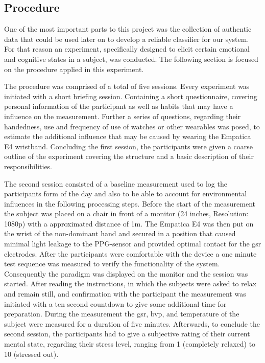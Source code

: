 \subsection{Procedure}
One of the most important parts to this project was the collection of authentic data that could be used later on to develop a reliable classifier for our system. For that reason an experiment, specifically designed to elicit certain emotional and cognitive states in a subject, was conducted. The following section is focused on the procedure applied in this experiment.

The procedure was comprised of a total of five sessions. Every experiment was initiated with a short briefing session. Containing a short questionnaire, covering personal information of the participant as well as habits that may have a influence on the measurement. Further a series of questions, regarding their handedness, use and frequency of use of watches or other wearables was posed, to estimate the additional influence that may be caused by wearing the Empatica E4 wristband.
Concluding the first session, the participants were given a coarse outline of the experiment covering the structure and a basic description of their responsibilities.

The second session consisted of a baseline measurement used to log the participants form of the day and also to be able to account for environmental influences in the following processing steps. Before the start of the measurement the subject was placed on a chair in front of a monitor (24 inches, Resolution: 1080p) with a approximated distance of 1m. The Empatica E4 was then put on the wrist of the non-dominant hand and secured in a position that caused minimal light leakage to the PPG-sensor and provided optimal contact for the \gls{gsr} electrodes. After the participants were comfortable with the device a one minute test sequence was measured to verify the functionality of the system.
Consequently the paradigm was displayed on the monitor and the session was started. After reading the instructions, in which the subjects were asked to relax and remain still, and confirmation with the participant the measurement was initiated with a ten second countdown to give some additional time for preparation.
During the measurement the \gls{gsr}, \gls{bvp}, and temperature of the subject were measured for a duration of five minutes.
Afterwards, to conclude the second session, the participants had to give a subjective rating of their current mental state, regarding their stress level, ranging from 1 (completely relaxed) to 10 (stressed out).

